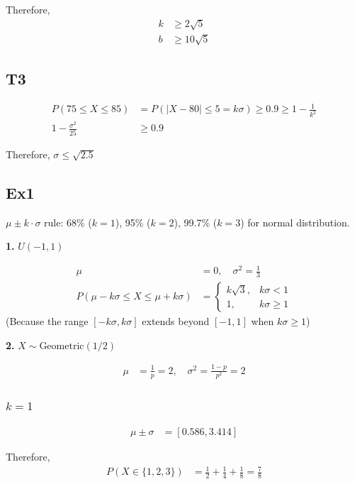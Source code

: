 \documentclass[12pt, a4paper]{article}
\begin{document}
Therefore,
\begin{align*}
k &\geq 2\sqrt{5} \\
b &\geq 10\sqrt{5}
\end{align*}

\subsection*{T3}
\begin{align*}
P(75 \leq X \leq 85) &= P(|X - 80| \leq 5 = k\sigma) \geq 0.9 \geq 1 - \frac{1}{k^2} \\
1 - \frac{\sigma^2}{25} &\geq 0.9
\end{align*}

Therefore, $\boxed{\sigma \leq \sqrt{2.5}}$

\subsection*{Ex1}
$\mu \pm k \cdot \sigma$ rule: 68\% ($k = 1$), 95\% ($k = 2$), 99.7\% ($k = 3$) for normal distribution.

\textbf{1.} $U(-1, 1)$

\begin{align*}
\mu &= 0, \quad \sigma^2 = \frac{1}{3} \\
P(\mu - k\sigma \leq X \leq \mu + k\sigma) &= 
\begin{cases} 
k\sqrt{3}, & k\sigma < 1 \\ 
1, & k\sigma \geq 1
\end{cases}
\end{align*}
(Because the range $[-k\sigma, k\sigma]$ extends beyond $[-1, 1]$ when $k\sigma \geq 1$)

\textbf{2.} $X \sim \text{Geometric}(1/2)$

\begin{align*}
\mu &= \frac{1}{p} = 2, \quad \sigma^2 = \frac{1-p}{p^2} = 2
\end{align*}

\subsubsection*{$k = 1$}
\begin{align*}
\mu \pm \sigma &= [0.586, 3.414]
\end{align*}

Therefore,
\begin{align*}
P(X \in \{1, 2, 3\}) &= \frac{1}{2} + \frac{1}{4} + \frac{1}{8} = \frac{7}{8}
\end{align*}
\end{document}
